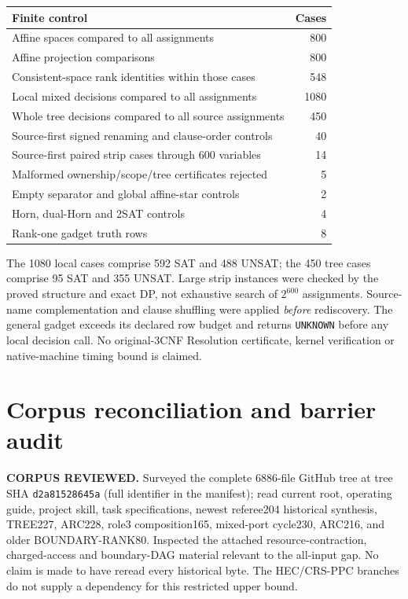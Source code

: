 \documentclass[11pt]{article}
\begin{document}
\begin{center}\begin{tabular}{lr}\toprule
Finite control & Cases\\\midrule
Affine spaces compared to all assignments &800\\
Affine projection comparisons &800\\
Consistent-space rank identities within those cases &548\\
Local mixed decisions compared to all assignments &1080\\
Whole tree decisions compared to all source assignments &450\\
Source-first signed renaming and clause-order controls &40\\
Source-first paired strip cases through 600 variables &14\\
Malformed ownership/scope/tree certificates rejected &5\\
Empty separator and global affine-star controls &2\\
Horn, dual-Horn and 2SAT controls &4\\
Rank-one gadget truth rows &8\\\bottomrule
\end{tabular}\end{center}
The 1080 local cases comprise 592 SAT and 488 UNSAT; the 450 tree cases comprise 95 SAT and 355 UNSAT. Large strip instances were checked by the proved structure and exact DP, not exhaustive search of $2^{600}$ assignments. Source-name complementation and clause shuffling were applied \emph{before} rediscovery. The general gadget exceeds its declared row budget and returns \texttt{UNKNOWN} before any local decision call. No original-3CNF Resolution certificate, kernel verification or native-machine timing bound is claimed.

\section{Corpus reconciliation and barrier audit}
\textbf{CORPUS REVIEWED.} Surveyed the complete 6886-file GitHub tree at tree SHA \texttt{d2a81528645a} (full identifier in the manifest); read current root, operating guide, project skill, task specifications, newest referee204 historical synthesis, TREE227, ARC228, role3 composition165, mixed-port cycle230, ARC216, and older BOUNDARY-RANK80. Inspected the attached resource-contraction, charged-access and boundary-DAG material relevant to the all-input gap. No claim is made to have reread every historical byte. The HEC/CRS-PPC branches do not supply a dependency for this restricted upper bound.
\end{document}
